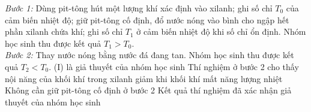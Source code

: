 \begin{ex}
\begin{center}
		\end{center}
		\textit{Bước 1:} Dùng pit-tông hút một lượng khí xác định vào xilanh; ghi số chỉ $T_0$ của cảm biến nhiệt độ; giữ pit-tông cố định, đổ nước nóng vào bình cho ngập hết phần xilanh chứa khí; ghi số chỉ $T_1$ ở cảm biến nhiệt độ khi số chỉ ổn định. Nhóm học sinh thu được kết quả $T_1>T_0$.\\
		\textit{Bước 2:} Thay nước nóng bằng nước đá đang tan. Nhóm học sinh thu được kết quả $T_2<T_0$.
		\choiceTFt
		{\True (I) là giả thuyết của nhóm học sinh}
		{\True Thí nghiệm ở bước 2 cho thấy nội năng của khối khí trong xilanh giảm khi khối khí mất năng lượng nhiệt}
		{Không cần giữ pit-tông cố định ở bước 2}
		{\True Kết quả thí nghiệm đã xác nhận giả thuyết của nhóm học sinh}
	\end{ex}

